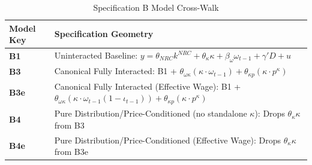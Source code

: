 \begin{table}[H]
\centering
\caption{Specification B Model Cross-Walk}
\label{tab:specB_crosswalk}
\scriptsize
\begin{tabular}{p{2cm} p{12cm}}
\toprule
\textbf{Model Key} & \textbf{Specification Geometry} \\
\midrule
\textbf{B1} & Uninteracted Baseline: $y = \theta_{NRC} k^{NRC} + \theta_{\kappa} \kappa + \beta_{\omega} \omega_{t-1} + \gamma' D + u$ \\
\textbf{B3} & Canonical Fully Interacted: B1 + $\theta_{\omega\kappa} (\kappa \cdot \omega_{t-1}) + \theta_{\kappa p} (\kappa \cdot p^{\kappa})$ \\
\textbf{B3e} & Canonical Fully Interacted (Effective Wage): B1 + $\theta_{\omega\kappa} (\kappa \cdot \omega_{t-1}(1-\iota_{t-1})) + \theta_{\kappa p} (\kappa \cdot p^{\kappa})$ \\
\textbf{B4} & Pure Distribution/Price-Conditioned (no standalone $\kappa$): Drops $\theta_{\kappa} \kappa$ from B3 \\
\textbf{B4e} & Pure Distribution/Price-Conditioned (Effective Wage): Drops $\theta_{\kappa} \kappa$ from B3e \\
\bottomrule
\end{tabular}
\end{table}
